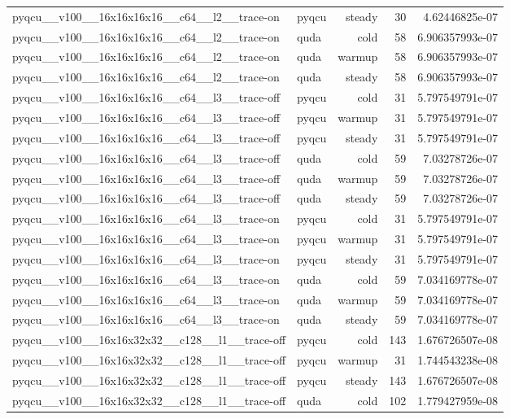 \begin{table}[htbp]
\begin{tabular}{@{}llrrr@{}}
pyqcu\_\_v100\_\_16x16x16x16\_\_c64\_\_l2\_\_trace-on & pyqcu & steady & 30 & 4.62446825e-07 \\
pyqcu\_\_v100\_\_16x16x16x16\_\_c64\_\_l2\_\_trace-on & quda & cold & 58 & 6.906357993e-07 \\
pyqcu\_\_v100\_\_16x16x16x16\_\_c64\_\_l2\_\_trace-on & quda & warmup & 58 & 6.906357993e-07 \\
pyqcu\_\_v100\_\_16x16x16x16\_\_c64\_\_l2\_\_trace-on & quda & steady & 58 & 6.906357993e-07 \\
pyqcu\_\_v100\_\_16x16x16x16\_\_c64\_\_l3\_\_trace-off & pyqcu & cold & 31 & 5.797549791e-07 \\
pyqcu\_\_v100\_\_16x16x16x16\_\_c64\_\_l3\_\_trace-off & pyqcu & warmup & 31 & 5.797549791e-07 \\
pyqcu\_\_v100\_\_16x16x16x16\_\_c64\_\_l3\_\_trace-off & pyqcu & steady & 31 & 5.797549791e-07 \\
pyqcu\_\_v100\_\_16x16x16x16\_\_c64\_\_l3\_\_trace-off & quda & cold & 59 & 7.03278726e-07 \\
pyqcu\_\_v100\_\_16x16x16x16\_\_c64\_\_l3\_\_trace-off & quda & warmup & 59 & 7.03278726e-07 \\
pyqcu\_\_v100\_\_16x16x16x16\_\_c64\_\_l3\_\_trace-off & quda & steady & 59 & 7.03278726e-07 \\
pyqcu\_\_v100\_\_16x16x16x16\_\_c64\_\_l3\_\_trace-on & pyqcu & cold & 31 & 5.797549791e-07 \\
pyqcu\_\_v100\_\_16x16x16x16\_\_c64\_\_l3\_\_trace-on & pyqcu & warmup & 31 & 5.797549791e-07 \\
pyqcu\_\_v100\_\_16x16x16x16\_\_c64\_\_l3\_\_trace-on & pyqcu & steady & 31 & 5.797549791e-07 \\
pyqcu\_\_v100\_\_16x16x16x16\_\_c64\_\_l3\_\_trace-on & quda & cold & 59 & 7.034169778e-07 \\
pyqcu\_\_v100\_\_16x16x16x16\_\_c64\_\_l3\_\_trace-on & quda & warmup & 59 & 7.034169778e-07 \\
pyqcu\_\_v100\_\_16x16x16x16\_\_c64\_\_l3\_\_trace-on & quda & steady & 59 & 7.034169778e-07 \\
pyqcu\_\_v100\_\_16x16x32x32\_\_c128\_\_l1\_\_trace-off & pyqcu & cold & 143 & 1.676726507e-08 \\
pyqcu\_\_v100\_\_16x16x32x32\_\_c128\_\_l1\_\_trace-off & pyqcu & warmup & 31 & 1.744543238e-08 \\
pyqcu\_\_v100\_\_16x16x32x32\_\_c128\_\_l1\_\_trace-off & pyqcu & steady & 143 & 1.676726507e-08 \\
pyqcu\_\_v100\_\_16x16x32x32\_\_c128\_\_l1\_\_trace-off & quda & cold & 102 & 1.779427959e-08 \\

\end{tabular}
\end{table}
